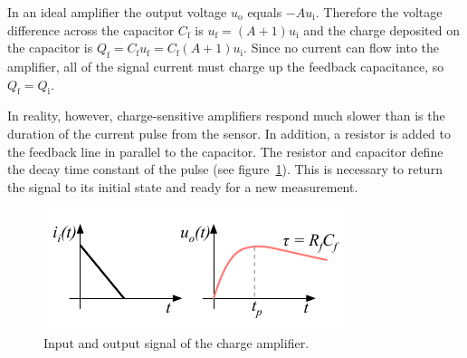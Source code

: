 In an ideal amplifier the output voltage $u_\mathrm{o}$ equals $-Au_\mathrm{i}$. Therefore the voltage difference across the capacitor $C_\mathrm{f}$ is $u_\mathrm{f}=(A+1)u_\mathrm{i}$ and the charge deposited on the capacitor is $Q_\mathrm{f}=C_\mathrm{f}u_\mathrm{f} = C_\mathrm{f}(A+1)u_\mathrm{i}$. Since no current can flow into the amplifier, all of the signal current must charge up the feedback capacitance, so $Q_\mathrm{f} = Q_\mathrm{i}$.

In reality, however, charge-sensitive amplifiers respond much slower than is the duration of the current pulse from the sensor. In addition, a resistor is added to the feedback line in parallel to the capacitor. The resistor and capacitor define the decay time constant of the pulse (see figure~\ref{fig:chgrc}). This is necessary to return the signal to its initial state and ready for a new measurement.
\begin{figure}[!t]
\begin{center}
\includegraphics[width=0.7\linewidth]{02_pulse_formation/pics/plots/chgrc}
\caption{Input and output signal of the charge amplifier.}
\label{fig:chgrc}
\end{center}
\end{figure}


